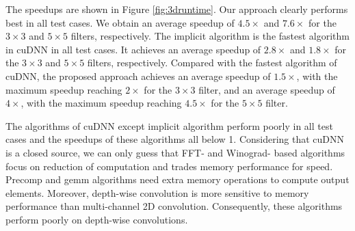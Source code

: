 



The speedups are shown in Figure \ref{fig:3druntime}. Our approach clearly performs best in all test cases. We obtain an average speedup of
$4.5\times$ and $7.6\times$ for the $3 \times 3$ and $5 \times 5$ filters, respectively. The implicit algorithm is the fastest algorithm in
cuDNN in all test cases. It achieves an average speedup of $2.8\times$ and $1.8\times$ for the $3 \times 3$ and $5 \times 5$ filters,
respectively. Compared with the fastest algorithm of cuDNN, the proposed approach achieves an average speedup of $1.5\times$, with the
maximum speedup reaching $2\times$ for the $3 \times 3$ filter, and an average speedup of $4\times$, with the maximum speedup reaching
$4.5\times$ for the $5 \times 5$ filter.

The algorithms of cuDNN except implicit algorithm perform poorly in all test cases and the speedups of these algorithms all below 1.
Considering that cuDNN is a closed source, we can only guess that FFT- and Winograd- based algorithms focus on reduction of computation and
trades memory performance for speed. Precomp and gemm algorithms need extra memory operations to compute output elements. Moreover,
depth-wise convolution is more sensitive to memory performance than multi-channel 2D convolution. Consequently, these algorithms perform
poorly on depth-wise convolutions.

